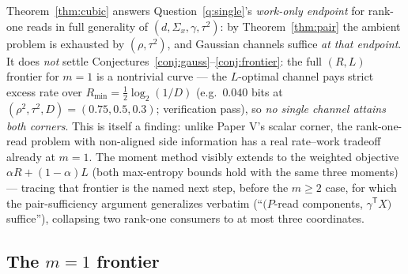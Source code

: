 \documentclass[11pt]{article}
\begin{document}
\begin{remark}
Theorem~\ref{thm:cubic} answers Question~\ref{q:single}'s \emph{work-only
endpoint} for rank-one reads in full generality of
$(d,\Sigma_x,\gamma,\tau^2)$: by Theorem~\ref{thm:pair} the ambient
problem is exhausted by $(\rho,\tau^2)$, and Gaussian channels suffice
\emph{at that endpoint}. It does \emph{not} settle
Conjectures~\ref{conj:gauss}--\ref{conj:frontier}: the full $(R,L)$
frontier for $m=1$ is a nontrivial curve --- the $L$-optimal
channel pays strict excess rate over $R_{\min}=\tfrac12\log_2(1/D)$
(e.g.\ $0.040$ bits at $(\rho^2,\tau^2,D)=(0.75,0.5,0.3)$; verification
pass), so \emph{no single channel attains both corners}. This is itself a
finding: unlike Paper V's scalar corner, the rank-one-read problem with
non-aligned side information has a real rate--work tradeoff already at
$m=1$. The moment method visibly extends to the weighted objective
$\alpha R+(1-\alpha)L$ (both max-entropy bounds hold with the same three
moments) --- tracing that frontier is the named next step, before the
$m\ge2$ case, for which the pair-sufficiency argument generalizes
verbatim (``$(P$-read components, $\gamma^{\mathsf T}X)$ suffice''),
collapsing two rank-one consumers to at most three coordinates.
\end{remark}

\subsection*{The $m=1$ frontier}
\end{document}
